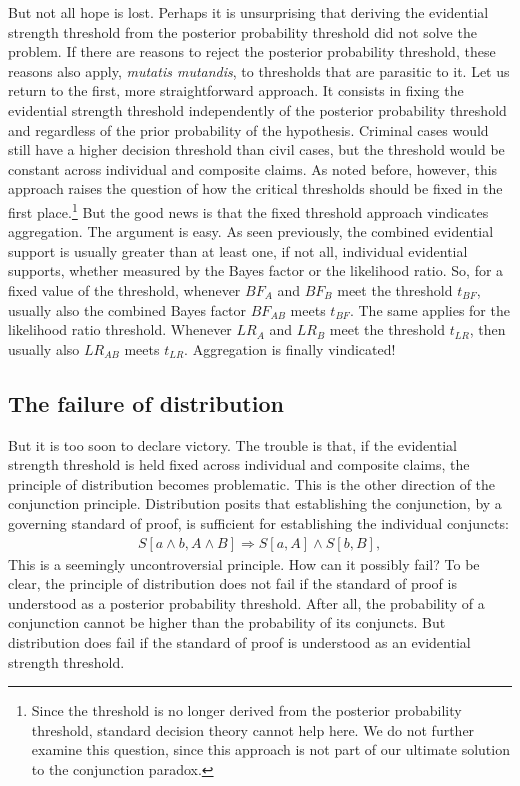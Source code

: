 \documentclass[
  10pt,
  dvipsnames,enabledeprecatedfontcommands]{scrartcl}
\begin{document}
But not all hope is lost. Perhaps it is unsurprising that deriving the
evidential strength threshold from the posterior probability threshold
did not solve the problem. If there are reasons to reject the posterior
probability threshold, these reasons also apply,
\emph{mutatis mutandis}, to thresholds that are parasitic to it. Let us
return to the first, more straightforward approach. It consists in
fixing the evidential strength threshold independently of the posterior
probability threshold and regardless of the prior probability of the
hypothesis. Criminal cases would still have a higher decision threshold
than civil cases, but the threshold would be constant across individual
and composite claims. As noted before, however, this approach raises the
question of how the critical thresholds should be fixed in the first
place.\footnote{Since the threshold is no longer derived from the
  posterior probability threshold, standard decision theory cannot help
  here. We do not further examine this question, since this approach is
  not part of our ultimate solution to the conjunction paradox.} But the
good news is that the fixed threshold approach vindicates aggregation.
The argument is easy. As seen previously, the combined evidential
support is usually greater than at least one, if not all, individual
evidential supports, whether measured by the Bayes factor or the
likelihood ratio. So, for a fixed value of the threshold, whenever
\(BF_A\) and \(BF_B\) meet the threshold \(t_{BF}\), usually also the
combined Bayes factor \(BF_{AB}\) meets \(t_{BF}\). The same applies for
the likelihood ratio threshold. Whenever \(LR_A\) and \(LR_B\) meet the
threshold \(t_{LR}\), then usually also \(LR_{AB}\) meets \(t_{LR}\).
Aggregation is finally vindicated!

\hypertarget{the-failure-of-distribution}{%
\subsection{The failure of
distribution}\label{the-failure-of-distribution}}

But it is too soon to declare victory. The trouble is that, if the
evidential strength threshold is held fixed across individual and
composite claims, the principle of distribution becomes problematic.
This is the other direction of the conjunction principle. Distribution
posits that establishing the conjunction, by a governing standard of
proof, is sufficient for establishing the individual conjuncts:
\begin{align}
S[a \wedge b, A\wedge B] \Rightarrow S[a, A] \wedge S[b, B], \tag{DIS1}
\end{align} This is a seemingly uncontroversial principle. How can it
possibly fail? To be clear, the principle of distribution does not fail
if the standard of proof is understood as a posterior probability
threshold. After all, the probability of a conjunction cannot be higher
than the probability of its conjuncts. But distribution does fail if the
standard of proof is understood as an evidential strength threshold.
\end{document}
